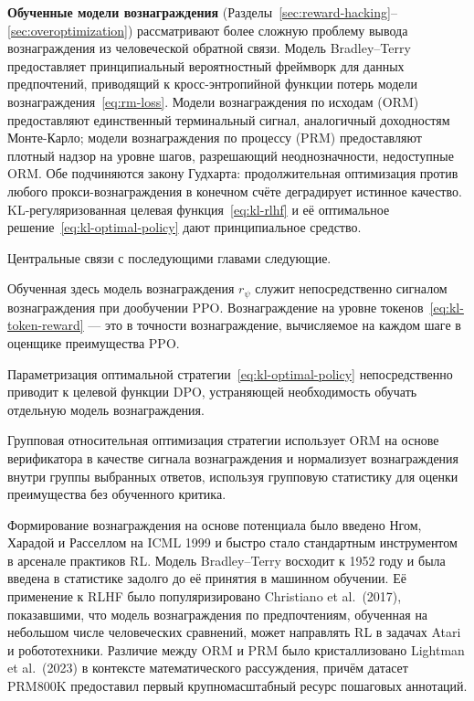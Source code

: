 \textbf{Обученные модели вознаграждения} (Разделы~\ref{sec:reward-hacking}--\ref{sec:overoptimization}) рассматривают более сложную проблему вывода вознаграждения из человеческой обратной связи. Модель Bradley--Terry предоставляет принципиальный вероятностный фреймворк для данных предпочтений, приводящий к кросс-энтропийной функции потерь модели вознаграждения~\eqref{eq:rm-loss}. Модели вознаграждения по исходам (ORM) предоставляют единственный терминальный сигнал, аналогичный доходностям Монте-Карло; модели вознаграждения по процессу (PRM) предоставляют плотный надзор на уровне шагов, разрешающий неоднозначности, недоступные ORM. Обе подчиняются закону Гудхарта: продолжительная оптимизация против любого прокси-вознаграждения в конечном счёте деградирует истинное качество. KL-регуляризованная целевая функция~\eqref{eq:kl-rlhf} и её оптимальное решение~\eqref{eq:kl-optimal-policy} дают принципиальное средство.

Центральные связи с последующими главами следующие.

\begin{description}[leftmargin=!,labelwidth=3.5cm]
  \item[Глава~\ref{ch:practical-rlhf} (PPO)] Обученная здесь модель вознаграждения $r_\psi$ служит непосредственно сигналом вознаграждения при дообучении PPO. Вознаграждение на уровне токенов~\eqref{eq:kl-token-reward} --- это в точности вознаграждение, вычисляемое на каждом шаге в оценщике преимущества PPO.
  \item[Глава~\ref{ch:practical-rlhf} (DPO)] Параметризация оптимальной стратегии~\eqref{eq:kl-optimal-policy} непосредственно приводит к целевой функции DPO, устраняющей необходимость обучать отдельную модель вознаграждения.
  \item[Глава~\ref{ch:practical-rlhf} (GRPO)] Групповая относительная оптимизация стратегии использует ORM на основе верификатора в качестве сигнала вознаграждения и нормализует вознаграждения внутри группы выбранных ответов, используя групповую статистику для оценки преимущества без обученного критика.
\end{description}

\begin{remark}
\label{rem:history}
Формирование вознаграждения на основе потенциала было введено Нгом, Харадой и Расселлом на ICML 1999 и быстро стало стандартным инструментом в арсенале практиков RL. Модель Bradley--Terry восходит к 1952 году и была введена в статистике задолго до её принятия в машинном обучении. Её применение к RLHF было популяризировано Christiano et al.\ (2017), показавшими, что модель вознаграждения по предпочтениям, обученная на небольшом числе человеческих сравнений, может направлять RL в задачах Atari и робототехники. Различие между ORM и PRM было кристаллизовано Lightman et al.\ (2023) в контексте математического рассуждения, причём датасет PRM800K предоставил первый крупномасштабный ресурс пошаговых аннотаций.
\end{remark}

